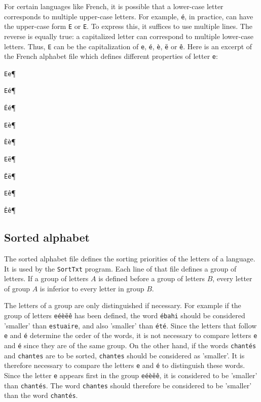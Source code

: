\bigskip
\noindent For certain languages like French, it is possible that a lower-case
letter corresponds to multiple upper-case letters. For example, \texttt{\'e}, in
practice, can have the upper-case form \verb+E+ or \texttt{E}. To express
this, it suffices to use multiple lines. The reverse is equally true: a capitalized letter
can correspond to multiple lower-case letters. Thus, \verb+E+ can be the
capitalization of \verb+e+, \texttt{\'e}, \texttt{\`e}, \texttt{\"e} or
\texttt{\^e}. Here is an excerpt of the French alphabet file which defines different properties of letter
\verb+e+:

\bigskip
\noindent
\texttt{Ee}\P

\noindent
\texttt{E\'e}\P

\noindent
\texttt{\'E\'e}\P

\noindent
\texttt{E\`e}\P

\noindent
\texttt{\`E\`e}\P


\noindent
\texttt{E\"e}\P

\noindent
\texttt{\"E\"e}\P

\noindent
\texttt{E\^e}\P

\noindent
\texttt{\^E\^e}\P

\subsection{Sorted alphabet}
The sorted alphabet file defines the sorting priorities of the letters of a
language. It is used by the \verb+SortTxt+
program. Each line
of that file defines a group of letters. If a group of letters $A$ is defined
before a group of letters $B$, every letter of group $A$ is inferior to every
letter in group $B$.

\bigskip
\noindent The letters of a group are only distinguished if necessary. For example if the
group of letters \texttt{e\'e\`e\"e\^e} has been defined, the word
\texttt{\'ebahi} should be considered 'smaller' than \verb+estuaire+, and also
'smaller' than \texttt{\'et\'e}. Since the letters that follow
\verb+e+ and \texttt{\'e} determine the order of the words, it is
not necessary to compare letters \verb+e+ and \texttt{\'e} since they
are of the same group. On the other hand, if the words
\texttt{chant\'es} and \verb+chantes+ are to be sorted,
\verb+chantes+ should be considered as 'smaller'. It is therefore 
necessary to compare the letters \verb+e+ and \texttt{\'e} to
distinguish these words. Since the letter \verb+e+ appears first in the 
group \texttt{e\'e\`e\"e\^e}, it is considered to be 'smaller' than \texttt{chant\'es}. The word
\verb+chantes+ should therefore be considered to be 'smaller' than the word
\texttt{chant\'es}.

